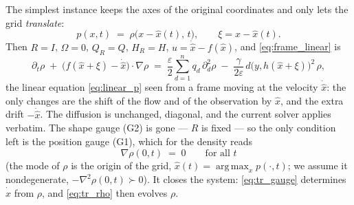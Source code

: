 \documentclass[11pt,a4paper]{article}
\newcommand{\argmax}{\operatorname{arg\,max}}
\newcommand{\xh}{\hat{x}}
\newcommand{\eps}{\varepsilon}
\newcommand{\grad}{\nabla}
\theoremstyle{plain}
\theoremstyle{definition}
\theoremstyle{remark}
\begin{document}
The simplest instance keeps the axes of the original coordinates and only lets the grid \emph{translate}:
\begin{equation}
  p(x,t) \;=\; \rho\big(x-\xh(t),\,t\big), \qquad \xi = x-\xh(t) .
  \label{eq:tr_ansatz}
\end{equation}
Then $R=I$, $\Omega=0$, $Q_R=Q$, $H_R=H$, $u = \dot{\xh}-f(\xh)$, and \eqref{eq:frame_linear} is
\begin{equation}
  \boxed{\;
  \partial_t\rho \;+\; \big(f(\xh+\xi) - \dot{\xh}\big)\cdot\grad\rho
  \;=\; \frac\eps2\sum_{d=1}^nq_d\,\partial_d^2\rho \;-\; \frac{\gamma}{2\eps}\,d\big(y,h(\xh+\xi)\big)^2\,\rho ,\;}
  \label{eq:tr_rho}
\end{equation}
the linear equation \eqref{eq:linear_p} seen from a frame moving at the velocity $\dot{\xh}$: the only changes are the shift of the flow and of the observation by $\xh$, and the extra drift $-\dot{\xh}$. The diffusion is unchanged, diagonal, and the current solver applies verbatim. The shape gauge (G2) is gone --- $R$ is fixed --- so the only condition left is the position gauge (G1), which for the density reads
\begin{equation}
  \grad\rho(0,t) \;=\; 0 \qquad\text{for all } t
  \label{eq:tr_gauge}
\end{equation}
(the mode of $\rho$ is the origin of the grid, $\xh(t)=\argmax_xp(\cdot,t)$; we assume it nondegenerate, $-\grad^2\rho(0,t)\succ0$). It closes the system: \eqref{eq:tr_gauge} determines $\dot{\xh}$ from $\rho$, and \eqref{eq:tr_rho} then evolves $\rho$.
\end{document}
